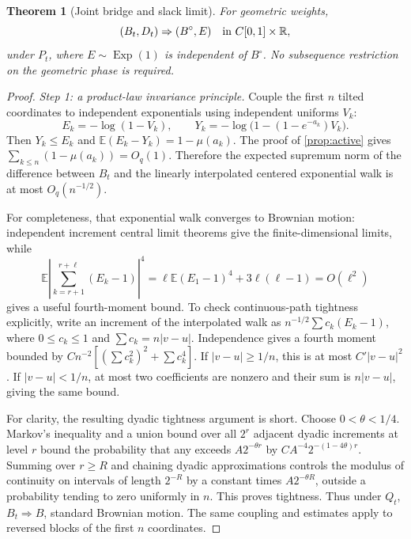 \documentclass[11pt,a4paper]{article}
\numberwithin{equation}{section}
\newtheorem{theorem}{Theorem}[section]
\theoremstyle{definition}
\theoremstyle{remark}
\newcommand{\R}{\mathbb R}
\newcommand{\E}{\mathbb E}
\newcommand{\Pt}{P_t}
\newcommand{\Exp}{\operatorname{Exp}}
\begin{document}
\begin{theorem}[Joint bridge and slack limit]\label{thm:bridge}
For geometric weights,
\begin{equation}\label{eq:bridge-limit}
 (B_t,D_t)\Rightarrow(B^\circ,E)
 \quad\hbox{in }C[0,1]\times\R,
\end{equation}
under $\Pt$, where $E\sim\Exp(1)$ is independent of $B^\circ$.
No subsequence restriction on the geometric phase is required.
\end{theorem}
\begin{proof}
\textit{Step 1: a product-law invariance principle.}
Couple the first $n$ tilted coordinates to independent exponentials
using independent uniforms $V_k$:
\[
 E_k=-\log(1-V_k),\qquad
 Y_k=-\log\bigl(1-(1-e^{-a_k})V_k\bigr).
\]
Then $Y_k\le E_k$ and
$\E(E_k-Y_k)=1-\mu(a_k)$. The proof of \cref{prop:active} gives
$\sum_{k\le n}(1-\mu(a_k))=O_q(1)$. Therefore the expected supremum
norm of the difference between $B_t$ and the linearly interpolated
centered exponential walk is at most $O_q(n^{-1/2})$.

For completeness, that exponential walk converges to Brownian
motion: independent increment central limit theorems give the
finite-dimensional limits, while
\[
 \E\left|\sum_{k=r+1}^{r+\ell}(E_k-1)\right|^4
 =\ell\E(E_1-1)^4+3\ell(\ell-1)=O(\ell^2)
\]
gives a useful fourth-moment bound. To check continuous-path
tightness explicitly, write an increment of the interpolated walk
as $n^{-1/2}\sum c_k(E_k-1)$, where $0\le c_k\le1$ and
$\sum c_k=n|v-u|$. Independence gives a fourth moment bounded by
$Cn^{-2}[(\sum c_k^2)^2+\sum c_k^4]$. If $|v-u|\ge1/n$, this
is at most $C'|v-u|^2$. If $|v-u|<1/n$, at most two coefficients
are nonzero and their sum is $n|v-u|$, giving the same bound.

For clarity, the resulting dyadic tightness argument is short.
Choose $0<\theta<1/4$. Markov's inequality and a union bound over
all $2^r$ adjacent dyadic increments at level $r$ bound the
probability that any exceeds $A2^{-\theta r}$ by
$CA^{-4}2^{-(1-4\theta)r}$. Summing over $r\ge R$ and chaining
dyadic approximations controls the modulus of continuity on
intervals of length $2^{-R}$ by a constant times
$A2^{-\theta R}$, outside a probability tending to zero uniformly
in $n$. This proves tightness. Thus under $Q_t$,
$B_t\Rightarrow B$, standard Brownian motion. The same coupling
and estimates apply to reversed blocks of the first $n$ coordinates.


\end{proof}
\end{document}
